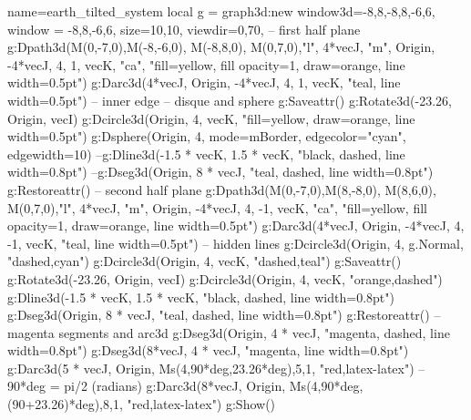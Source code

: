 \documentclass{standalone}
\begin{document}
\begin{luadraw}{name=earth_tilted_system}
local g = graph3d:new{
    window3d={-8,8,-8,8,-6,6}, 
    window = {-8,8,-6,6},
    size={10,10}, 
    viewdir={0,70},
}
-- first half plane
g:Dpath3d({M(0,-7,0),M(-8,-6,0), M(-8,8,0), M(0,7,0),"l", 4*vecJ, "m", Origin, -4*vecJ, 4, 1, vecK, "ca"},
    "fill=yellow, fill opacity=1, draw=orange, line width=0.5pt")
g:Darc3d(4*vecJ, Origin, -4*vecJ, 4, 1, vecK, "teal, line width=0.5pt") -- inner edge
-- disque and sphere
g:Saveattr()
g:Rotate3d(-23.26, {Origin, vecI})
g:Dcircle3d(Origin, 4, vecK, "fill=yellow, draw=orange, line width=0.5pt")
g:Dsphere(Origin, 4, {mode=mBorder, edgecolor="cyan", edgewidth=10})
--g:Dline3d({-1.5 * vecK, 1.5 * vecK}, "black, dashed, line width=0.8pt")
--g:Dseg3d({Origin, 8 * vecJ}, "teal, dashed, line width=0.8pt")
g:Restoreattr()
-- second half plane
g:Dpath3d({M(0,-7,0),M(8,-8,0), M(8,6,0), M(0,7,0),"l", 4*vecJ, "m", Origin, -4*vecJ, 4, -1, vecK, "ca"},
    "fill=yellow, fill opacity=1, draw=orange, line width=0.5pt")
g:Darc3d(4*vecJ, Origin, -4*vecJ, 4, -1, vecK, "teal, line width=0.5pt")
-- hidden lines
g:Dcircle3d(Origin, 4, g.Normal, "dashed,cyan")
g:Dcircle3d(Origin, 4, vecK, "dashed,teal")
g:Saveattr()
g:Rotate3d(-23.26, {Origin, vecI})
g:Dcircle3d(Origin, 4, vecK, "orange,dashed")
g:Dline3d({-1.5 * vecK, 1.5 * vecK}, "black, dashed, line width=0.8pt")
g:Dseg3d({Origin, 8 * vecJ}, "teal, dashed, line width=0.8pt")
g:Restoreattr()
-- magenta segments and arc3d
g:Dseg3d({Origin, 4 * vecJ}, "magenta, dashed, line width=0.8pt")
g:Dseg3d({8*vecJ, 4 * vecJ}, "magenta, line width=0.8pt")
g:Darc3d(5 * vecJ, Origin, Ms(4,90*deg,23.26*deg),5,1, "red,latex-latex") -- 90*deg = pi/2 (radians)
g:Darc3d(8*vecJ, Origin, Ms(4,90*deg,(90+23.26)*deg),8,1, "red,latex-latex")
g:Show()
\end{luadraw}
\end{document}
